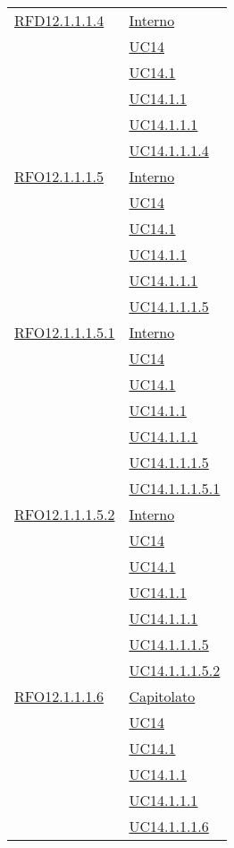\begin{longtable}{|>{\centering}m{5cm}|m{5cm}<{\centering}|}
 \hyperlink{RFD12.1.1.1.4}{RFD12.1.1.1.4} 
 & \hyperlink{Interno}{Interno}\\
& \hyperref[UC14]{UC14}\\
& \hyperref[UC14.1]{UC14.1}\\
& \hyperref[UC14.1.1]{UC14.1.1}\\
& \hyperref[UC14.1.1.1]{UC14.1.1.1}\\
& \hyperref[UC14.1.1.1.4]{UC14.1.1.1.4}\\\hline

 \hyperlink{RFO12.1.1.1.5}{RFO12.1.1.1.5} 
 & \hyperlink{Interno}{Interno}\\
& \hyperref[UC14]{UC14}\\
& \hyperref[UC14.1]{UC14.1}\\
& \hyperref[UC14.1.1]{UC14.1.1}\\
& \hyperref[UC14.1.1.1]{UC14.1.1.1}\\
& \hyperref[UC14.1.1.1.5]{UC14.1.1.1.5}\\\hline

 \hyperlink{RFO12.1.1.1.5.1}{RFO12.1.1.1.5.1} 
 & \hyperlink{Interno}{Interno}\\
& \hyperref[UC14]{UC14}\\
& \hyperref[UC14.1]{UC14.1}\\
& \hyperref[UC14.1.1]{UC14.1.1}\\
& \hyperref[UC14.1.1.1]{UC14.1.1.1}\\
& \hyperref[UC14.1.1.1.5]{UC14.1.1.1.5}\\
& \hyperref[UC14.1.1.1.5.1]{UC14.1.1.1.5.1}\\\hline

 \hyperlink{RFO12.1.1.1.5.2}{RFO12.1.1.1.5.2} 
 & \hyperlink{Interno}{Interno}\\
& \hyperref[UC14]{UC14}\\
& \hyperref[UC14.1]{UC14.1}\\
& \hyperref[UC14.1.1]{UC14.1.1}\\
& \hyperref[UC14.1.1.1]{UC14.1.1.1}\\
& \hyperref[UC14.1.1.1.5]{UC14.1.1.1.5}\\
& \hyperref[UC14.1.1.1.5.2]{UC14.1.1.1.5.2}\\\hline

 \hyperlink{RFO12.1.1.1.6}{RFO12.1.1.1.6} 
  & \hyperlink{Capitolato}{Capitolato}\\
& \hyperref[UC14]{UC14}\\
& \hyperref[UC14.1]{UC14.1}\\
& \hyperref[UC14.1.1]{UC14.1.1}\\
& \hyperref[UC14.1.1.1]{UC14.1.1.1}\\
& \hyperref[UC14.1.1.1.6]{UC14.1.1.1.6}\\\hline


\end{longtable}
